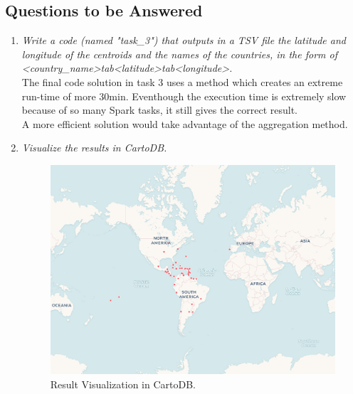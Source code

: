 \documentclass{article}
\begin{document}
\subsection*{Questions to be Answered}
\begin{enumerate}[label=\alph*)]
    \item \textit{Write a code (named "task\_3") that outputs in a TSV file the latitude and longitude of the centroids and the names of the countries, in the form of \textless country\_name\textgreater tab\textless latitude\textgreater tab\textless longitude\textgreater .}\\
    
    The final code solution in task 3 uses a method which creates an extreme run-time of more 30min. Eventhough the execution time is extremely slow because of so many Spark tasks, it still gives the correct result.\\
    
    A more efficient solution would take advantage of the aggregation method.\\
    
    \item \textit{Visualize the results in CartoDB.}\\
    
    \begin{figure}[H]
        \centering
        \includegraphics[width=11.9cm]{PhaseOne/docs/img/cartodb-visualization.png}
        \caption{Result Visualization in CartoDB.}
        \label{fig:cartodb}
    \end{figure}
    
\end{enumerate}


\end{document}
